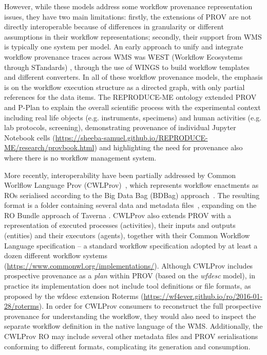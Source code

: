 \documentclass[10pt,letterpaper]{article}
\begin{document}
However, while these models address some workflow provenance representation issues, they have two main limitations: firstly, the extensions of PROV are not directly interoperable because of differences in granularity or different assumptions in their workflow representations; secondly, their support from WMS is typically one system per model.  An early approach to unify and integrate workflow provenance traces across WMS was WEST (Workflow Ecosystems through STandards) \cite{Garijo 2014}, through the use of WINGS \cite{Gil 2011} to build workflow templates and different converters. In all of these workflow provenance models, the emphasis is on the workflow execution structure as a directed graph, with only partial references for the data items. 
The REPRODUCE-ME ontology \cite{Samuel 2022} extended PROV and P-Plan to explain the overall scientific process with the experimental context including real life objects (e.g. instruments, specimens) and human activities (e.g. lab protocols, screening), demonstrating provenance of individual Jupyter Notebook cells (\url{https://sheeba-samuel.github.io/REPRODUCE-ME/research/provbook.html}) and highlighting the need for provenance also where there is no workflow management system. 

More recently, interoperability have been partially addressed by Common Worlflow Language Prov (CWLProv)~\cite{Khan 2019}, which represents workflow enactments as ROs serialised according to the Big Data Bag (BDBag) approach~\cite{Chard 2016}.
The resulting format is a folder containing several data and metadata files~\cite{Soiland-Reyes 2018}, expanding on the RO Bundle approach of Taverna \cite{Soiland-Reyes 2016}.
CWLProv also extends PROV with a representation of executed processes (activities), their inputs and outputs (entities) and their executors (agents), together with their Common Workflow Language specification
\cite{Crusoe 2022} -- a standard workflow specification adopted by at least a dozen different workflow systems (\url{https://www.commonwl.org/implementations/}). Although CWLProv includes prospective provenance as a \emph{plan}
within PROV (based on the \emph{wfdesc} model), in practice its implementation does not include tool definitions or file formats, as proposed by the wfdesc extension Roterms (\url{https://wf4ever.github.io/ro/2016-01-28/roterms}).
In order for CWLProv consumers to reconstruct the full prospective provenance for understanding the workflow, they would also need to inspect the separate workflow definition in the native language of the WMS.
Additionally, the CWLProv RO may include several other metadata files and PROV serialisations conforming to different formats, complicating its generation and consumption.
\end{document}
